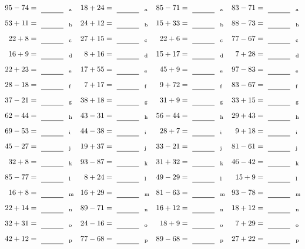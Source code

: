 \documentclass
[
  draft    = true,
  fontsize = 11pt,
  parskip  = half-
]
{scrartcl}
\begin{document}
\clearpage
\begin{align*}
    \pline{95-74}&=\rline{a}
  & \pline{18+24}&=\rline{a}
  & \pline{85-71}&=\rline{a}
  & \pline{83-71}&=\rline{a} \\[1ex]
    \pline{53+11}&=\rline{b}
  & \pline{24+12}&=\rline{b}
  & \pline{15+33}&=\rline{b}
  & \pline{88-73}&=\rline{b} \\[1ex]
    \pline{22+8}&=\rline{c}
  & \pline{27+15}&=\rline{c}
  & \pline{22+6}&=\rline{c}
  & \pline{77-67}&=\rline{c} \\[1ex]
    \pline{16+9}&=\rline{d}
  & \pline{8+16}&=\rline{d}
  & \pline{15+17}&=\rline{d}
  & \pline{7+28}&=\rline{d} \\[1ex]
    \pline{22+23}&=\rline{e}
  & \pline{17+55}&=\rline{e}
  & \pline{45+9}&=\rline{e}
  & \pline{97-83}&=\rline{e} \\[1ex]
    \pline{28-18}&=\rline{f}
  & \pline{7+17}&=\rline{f}
  & \pline{9+72}&=\rline{f}
  & \pline{83-67}&=\rline{f} \\[1ex]
    \pline{37-21}&=\rline{g}
  & \pline{38+18}&=\rline{g}
  & \pline{31+9}&=\rline{g}
  & \pline{33+15}&=\rline{g} \\[1ex]
    \pline{62-44}&=\rline{h}
  & \pline{43-31}&=\rline{h}
  & \pline{56-44}&=\rline{h}
  & \pline{29+43}&=\rline{h} \\[1ex]
    \pline{69-53}&=\rline{i}
  & \pline{44-38}&=\rline{i}
  & \pline{28+7}&=\rline{i}
  & \pline{9+18}&=\rline{i} \\[1ex]
    \pline{45-27}&=\rline{j}
  & \pline{19+37}&=\rline{j}
  & \pline{33-21}&=\rline{j}
  & \pline{81-61}&=\rline{j} \\[1ex]
    \pline{32+8}&=\rline{k}
  & \pline{93-87}&=\rline{k}
  & \pline{31+32}&=\rline{k}
  & \pline{46-42}&=\rline{k} \\[1ex]
    \pline{85-77}&=\rline{l}
  & \pline{8+24}&=\rline{l}
  & \pline{49-29}&=\rline{l}
  & \pline{15+9}&=\rline{l} \\[1ex]
    \pline{16+8}&=\rline{m}
  & \pline{16+29}&=\rline{m}
  & \pline{81-63}&=\rline{m}
  & \pline{93-78}&=\rline{m} \\[1ex]
    \pline{22+14}&=\rline{n}
  & \pline{89-71}&=\rline{n}
  & \pline{16+12}&=\rline{n}
  & \pline{18+12}&=\rline{n} \\[1ex]
    \pline{32+31}&=\rline{o}
  & \pline{24-16}&=\rline{o}
  & \pline{18+9}&=\rline{o}
  & \pline{7+29}&=\rline{o} \\[1ex]
    \pline{42+12}&=\rline{p}
  & \pline{77-68}&=\rline{p}
  & \pline{89-68}&=\rline{p}
  & \pline{27+22}&=\rline{p}
\end{align*}
\end{document}
